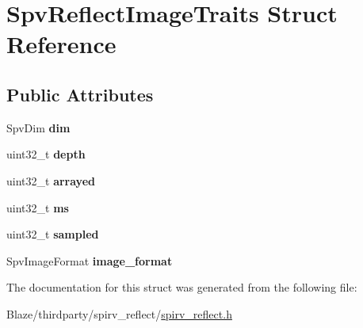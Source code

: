 \hypertarget{structSpvReflectImageTraits}{}\section{Spv\+Reflect\+Image\+Traits Struct Reference}
\label{structSpvReflectImageTraits}
\subsection*{Public Attributes}
\begin{DoxyCompactItemize}
\item 
\mbox{\label{structSpvReflectImageTraits_a8b9acedee4ec509e9a02459ae89882b1}} 
Spv\+Dim {\bfseries dim}
\item 
\mbox{\label{structSpvReflectImageTraits_a3f726906440bec6c69febfb876f2451d}} 
uint32\+\_\+t {\bfseries depth}
\item 
\mbox{\label{structSpvReflectImageTraits_a458640e5cfb554591df0408c4beaefb9}} 
uint32\+\_\+t {\bfseries arrayed}
\item 
\mbox{\label{structSpvReflectImageTraits_ad62fefefdb3c16768424126684d32be0}} 
uint32\+\_\+t {\bfseries ms}
\item 
\mbox{\label{structSpvReflectImageTraits_a8b4d09f67e70cdd6248eb6b09b51bc69}} 
uint32\+\_\+t {\bfseries sampled}
\item 
\mbox{\label{structSpvReflectImageTraits_ae0e75b2400c6e2a25c5c630fb3b97f49}} 
Spv\+Image\+Format {\bfseries image\+\_\+format}
\end{DoxyCompactItemize}


The documentation for this struct was generated from the following file\+:\begin{DoxyCompactItemize}
\item 
Blaze/thirdparty/spirv\+\_\+reflect/\hyperlink{spirv__reflect_8h}{spirv\+\_\+reflect.\+h}\end{DoxyCompactItemize}
